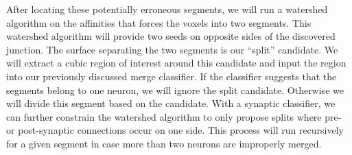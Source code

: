 After locating these potentially erroneous segments, we will run a watershed algorithm on the affinities that forces the voxels into two segments.
This watershed algorithm will provide two seeds on opposite sides of the discovered junction.
The surface separating the two segments is our ``split'' candidate.
We will extract a cubic region of interest around this candidate and input the region into our previously discussed merge classifier.
If the classifier suggests that the segments belong to one neuron, we will ignore the split candidate.
Otherwise we will divide this segment based on the candidate.
With a synaptic classifier, we can further constrain the watershed algorithm to only propose splits where pre- or post-synaptic connections occur on one side.
This process will run recursively for a given segment in case more than two neurons are improperly merged.
